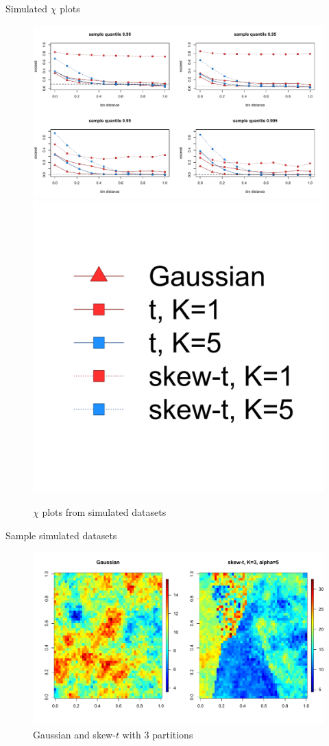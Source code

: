\documentclass{beamer}
\begin{document}
\begin{frame}{Simulated $\chi$ plots}
  \centering
  \begin{figure}
  \includegraphics[width=1\linewidth]{./plots/chi-plots.pdf}\\[-0.25in]
  \includegraphics[width=0.2\linewidth]{./plots/chi-legend.pdf}
  \caption{$\chi$ plots from simulated datasets}
  \end{figure}
\end{frame}


\begin{frame}{Sample simulated datasets}
  \centering
  \begin{figure}
  \includegraphics[width=1\linewidth]{./plots/gauss-vs-skew-t3.pdf}
  \caption{Gaussian and skew-$t$ with 3 partitions}
  \end{figure}
\end{frame}
\end{document}
